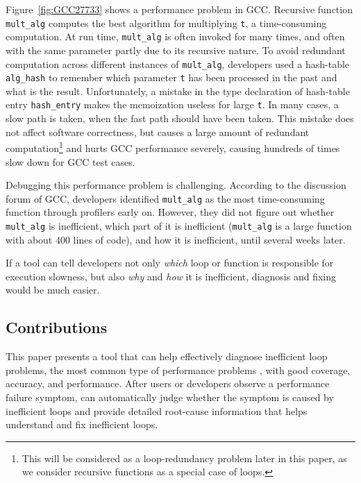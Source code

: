 Figure~\ref{fig:GCC27733} shows a performance problem in GCC. 
Recursive function \texttt{mult\_alg} computes the best algorithm for 
multiplying \texttt{t}, a time-consuming computation. 
At run time, \texttt{mult\_alg} is often invoked for many times, and often
with the same parameter partly due to its recursive nature.
To avoid redundant computation across different instances of
\texttt{mult\_alg}, developers used a
hash-table
\texttt{alg\_hash} to remember which parameter \texttt{t} has been processed
in the past and what is the result. 
Unfortunately, a mistake in the type declaration of hash-table
entry \texttt{hash\_entry} makes the memoization useless for large \texttt{t}.
In many cases, a slow path is taken, when the fast path should have been taken.
This mistake does not affect software correctness, but causes a large amount
of redundant computation\footnote{This will be considered as a
loop-redundancy problem later in this paper, as we consider
recursive functions as a special case of loops.} 
and hurts GCC performance severely,
causing hundreds of times slow down for GCC test cases.

Debugging this performance problem is challenging. According to 
the discussion forum of GCC, developers identified
\texttt{mult\_alg} as the most time-consuming function
through profilers early on. However, they did not figure out 
whether \texttt{mult\_alg} is inefficient, which part of it is 
inefficient (\texttt{mult\_alg} is a large function with about 400 lines of 
code), and how it is inefficient, until several weeks later.

If a tool can tell developers not only \emph{which} loop or function is
responsible for execution slowness, but also \emph{why} and \emph{how}
it is inefficient, 
diagnosis and fixing
would be much easier. 

\iffalse
Clearly, more research is needed to improve the state of the art of performance
diagnosis --- better diagnosis
coverage, better diagnosis accuracy, and low run-time
overhead for common performance problems,
especially loop-related performance problems.
\fi


\subsection{Contributions}
This paper presents a tool \Tool that can help effectively diagnose
inefficient loop problems, the most common type of performance problems
\cite{SongOOPSLA2014,PerfBug}, with good coverage, accuracy, and performance.
After users or developers observe a performance failure symptom, \Tool can 
automatically judge whether the symptom is caused by inefficient loops and
provide detailed root-cause information that helps understand and fix 
inefficient loops. 


